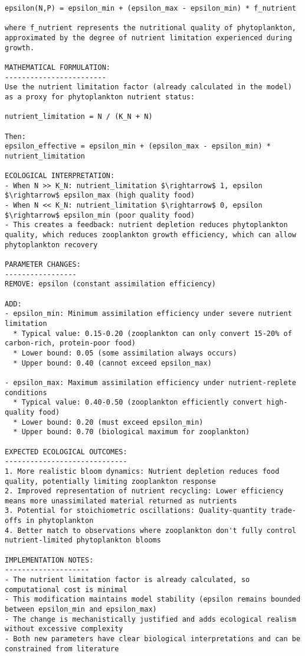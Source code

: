 \begin{lstlisting}
epsilon(N,P) = epsilon_min + (epsilon_max - epsilon_min) * f_nutrient

where f_nutrient represents the nutritional quality of phytoplankton, approximated by the degree of nutrient limitation experienced during growth.

MATHEMATICAL FORMULATION:
------------------------
Use the nutrient limitation factor (already calculated in the model) as a proxy for phytoplankton nutrient status:

nutrient_limitation = N / (K_N + N)

Then:
epsilon_effective = epsilon_min + (epsilon_max - epsilon_min) * nutrient_limitation

ECOLOGICAL INTERPRETATION:
- When N >> K_N: nutrient_limitation $\rightarrow$ 1, epsilon $\rightarrow$ epsilon_max (high quality food)
- When N << K_N: nutrient_limitation $\rightarrow$ 0, epsilon $\rightarrow$ epsilon_min (poor quality food)
- This creates a feedback: nutrient depletion reduces phytoplankton quality, which reduces zooplankton growth efficiency, which can allow phytoplankton recovery

PARAMETER CHANGES:
-----------------
REMOVE: epsilon (constant assimilation efficiency)

ADD:
- epsilon_min: Minimum assimilation efficiency under severe nutrient limitation
  * Typical value: 0.15-0.20 (zooplankton can only convert 15-20% of carbon-rich, protein-poor food)
  * Lower bound: 0.05 (some assimilation always occurs)
  * Upper bound: 0.40 (cannot exceed epsilon_max)

- epsilon_max: Maximum assimilation efficiency under nutrient-replete conditions
  * Typical value: 0.40-0.50 (zooplankton efficiently convert high-quality food)
  * Lower bound: 0.20 (must exceed epsilon_min)
  * Upper bound: 0.70 (biological maximum for zooplankton)

EXPECTED ECOLOGICAL OUTCOMES:
-----------------------------
1. More realistic bloom dynamics: Nutrient depletion reduces food quality, potentially limiting zooplankton response
2. Improved representation of nutrient recycling: Lower efficiency means more unassimilated material returned as nutrients
3. Potential for stoichiometric oscillations: Quality-quantity trade-offs in phytoplankton
4. Better match to observations where zooplankton don't fully control nutrient-limited phytoplankton blooms

IMPLEMENTATION NOTES:
--------------------
- The nutrient limitation factor is already calculated, so computational cost is minimal
- This modification maintains model stability (epsilon remains bounded between epsilon_min and epsilon_max)
- The change is mechanistically justified and adds ecological realism without excessive complexity
- Both new parameters have clear biological interpretations and can be constrained from literature


\end{lstlisting}
